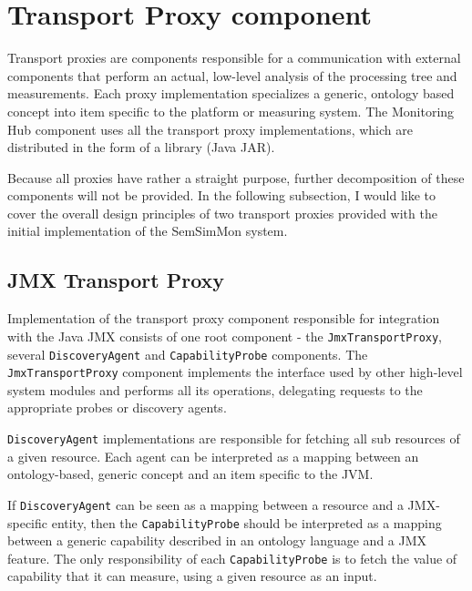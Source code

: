 %
\section{Transport Proxy component}
\label{sec:arch_tproxy}

Transport proxies are components responsible for a communication with external components that perform an actual, low-level analysis of the processing tree and measurements. Each proxy implementation specializes a generic, ontology based concept into item specific to the platform or measuring system. The Monitoring Hub component uses all the transport proxy implementations, which are distributed in the form of a library (Java JAR).

Because all proxies have rather a straight purpose, further decomposition of these components will not be provided. In the following subsection, I would like to cover the overall design principles of two transport proxies provided with the initial implementation of the SemSimMon system.

\subsection{JMX Transport Proxy}

Implementation of the transport proxy component responsible for integration with the Java JMX consists of one root component - the \texttt{JmxTransportProxy}, several \texttt{DiscoveryAgent} and \texttt{CapabilityProbe} components. The \texttt{JmxTransportProxy} component implements the interface used by other high-level system modules and performs all its operations, delegating requests to the appropriate probes or discovery agents.

\texttt{DiscoveryAgent} implementations are responsible for fetching all sub resources of a given resource. Each agent can be interpreted as a mapping between an ontology-based, generic concept and an item specific to the JVM. 

If \texttt{DiscoveryAgent} can be seen as a mapping between a resource and a JMX-specific entity, then the \texttt{CapabilityProbe} should be interpreted as a mapping between a generic capability described in an ontology language and a JMX feature. The only responsibility of each \texttt{CapabilityProbe} is to fetch the value of capability that it can measure, using a given resource as an input.

